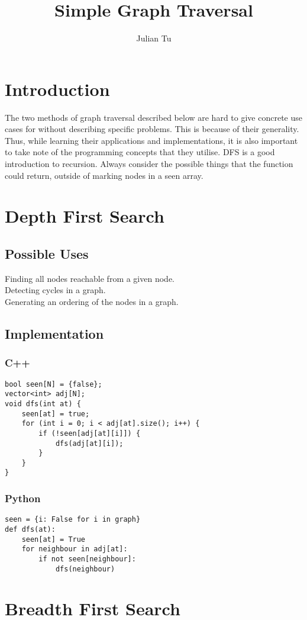 \documentclass{article}
\title{Simple Graph Traversal}
\author{Julian Tu}
\date{}
\begin{document}
\maketitle
\section{Introduction}
The two methods of graph traversal described below are hard to give concrete use cases for without describing specific problems. This is because of their generality. Thus, while learning their applications and implementations, it is also important to take note of the programming concepts that they utilise. DFS is a good introduction to recursion. Always consider the possible things that the function could return, outside of marking nodes in a seen array.
\section{Depth First Search}
\subsection{Possible Uses}
Finding all nodes reachable from a given node.\\Detecting cycles in a graph.\\Generating an ordering of the nodes in a graph.
\subsection{Implementation}
\subsubsection{C++}
\begin{verbatim}
bool seen[N] = {false};
vector<int> adj[N];
void dfs(int at) {
    seen[at] = true;
    for (int i = 0; i < adj[at].size(); i++) {
        if (!seen[adj[at][i]]) {
            dfs(adj[at][i]);
        }
    }
}
\end{verbatim}
\subsubsection{Python}
\begin{verbatim}
seen = {i: False for i in graph}
def dfs(at):
    seen[at] = True
    for neighbour in adj[at]:
        if not seen[neighbour]:
            dfs(neighbour)
\end{verbatim}
\section{Breadth First Search}
\end{document}
